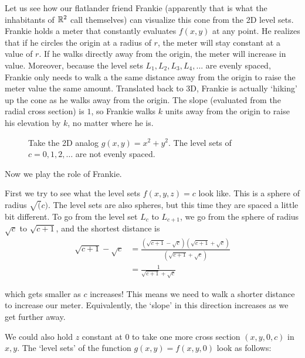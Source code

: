 Let us see how our flatlander friend Frankie (apparently that is what the inhabitants of $\mathbb{R}^2$ call themselves) can visualize this cone from the 2D level sets. Frankie holds a meter that constantly evaluates $f(x,y)$ at any point. He realizes that if he circles the origin at a radius of $r$, the meter will stay constant at a value of $r$. If he walks directly away from the origin, the meter will increase in value. Moreover, because the level sets $L_1,L_2,L_3,L_4,...$ are evenly spaced, Frankie only needs to walk a the same distance away from the origin to raise the meter value the same amount. Translated back to 3D, Frankie is actually `hiking' up the cone as he walks away from the origin. The slope (evaluated from the radial cross section) is $1$, so Frankie walks $k$ units away from the origin to raise his elevation by $k$, no matter where he is.

 \begin{figure}
    \centering
    \caption{Take the 2D analog $g(x,y)=x^2+y^2$. The level sets of $c=0,1,2,\ldots$ are not evenly spaced.}
\end{figure}
Now we play the role of Frankie. 

First we try to see what the level sets $f(x,y,z)=c$ look like. This is a sphere of radius $\sqrt(c)$. The level sets are also spheres, but this time they are spaced a little bit different. To go from the level set $L_c$ to $L_{c+1}$, we go from the sphere of radius $\sqrt{c}$ to $\sqrt{c+1}$, and the shortest distance is  \begin{align*}
    \sqrt{c+1}-\sqrt{c}&=  \frac{(\sqrt{c+1}-\sqrt{c})(\sqrt{c+1}+\sqrt{c})}{(\sqrt{c+1}+\sqrt{c})}\\ &= \frac{1}{\sqrt{c+1}+\sqrt{c}}
\end{align*}

which gets smaller as $c$ increases! This means we need to walk a shorter distance to increase our meter. Equivalently, the `slope' in this direction increases as we get further away.

We could also hold $z$ constant at $0$ to take one more cross section $(x,y,0,c)$ in $x,y$. The `level sets' of the function $g(x,y)=f(x,y,0)$ look as follows:



